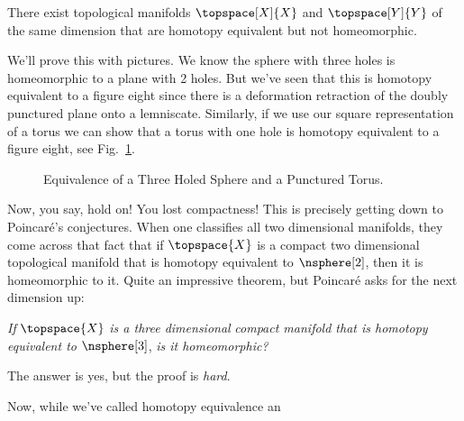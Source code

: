 \documentclass{book}                                                           %
\begin{document}
                \begin{theorem}
                    There exist topological manifolds $\topspace[X]{X}$ and
                    $\topspace[Y]{Y}$ of the same dimension that are homotopy
                    equivalent but not homeomorphic.
                \end{theorem}
                We'll prove this with pictures. We know the sphere with three
                holes is homeomorphic to a plane with 2 holes. But we've seen
                that this is homotopy equivalent to a figure eight since there
                is a deformation retraction of the doubly punctured plane onto
                a lemniscate. Similarly, if we use our square representation of
                a torus we can show that a torus with one hole is homotopy
                equivalent to a figure eight, see
                Fig.~\ref{fig:HE_Torus_Sphere_Fig_8}.
                \begin{figure}[H]
                        \centering
                        \captionsetup{type=figure}
                        \resizebox{\textwidth}{!}{%
                        }
                        \caption{Equivalence of a Three Holed Sphere
                                 and a Punctured Torus.}
                        \label{fig:HE_Torus_Sphere_Fig_8}
                \end{figure}
                Now, you say, hold on! You lost compactness! This is precisely
                getting down to Poincar\'{e}'s conjectures. When one classifies
                all two dimensional manifolds, they come across that fact that
                if $\topspace{X}$ is a compact two dimensional topological
                manifold that is homotopy equivalent to $\nsphere[2]$, then it
                is homeomorphic to it. Quite an impressive theorem, but
                Poincar\'{e} asks for the next dimension up:
                \begin{center}
                    \textit{If} $\topspace{X}$ \textit{is a three dimensional}
                    \textit{compact manifold that is homotopy equivalent to}
                    $\nsphere[3]$, \textit{is it homeomorphic?}
                \end{center}
                The answer is yes, but the proof is \textit{hard}.
                \par\hfill\par
                Now, while we've called homotopy equivalence an
\end{document}
